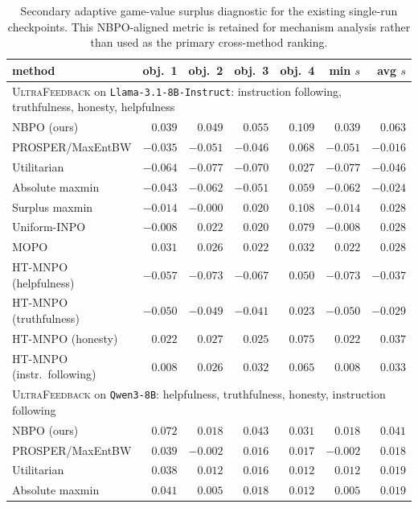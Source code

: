 \documentclass{article}
\theoremstyle{remark}
\theoremstyle{plain}
\newcommand{\NBPO}{\textsc{NBPO}}
\begin{document}
\begin{table}[t]
\centering\scriptsize
\setlength{\tabcolsep}{3.2pt}
\caption{Secondary adaptive game-value surplus diagnostic for the existing single-run checkpoints. This NBPO-aligned metric is retained for mechanism analysis rather than used as the primary cross-method ranking.}
\label{tab:objectivewise-appendix}
\begin{tabular}{lrrrrrr}
\toprule
method & obj.\ 1 & obj.\ 2 & obj.\ 3 & obj.\ 4 & min $s$ & avg $s$\\
\midrule
\multicolumn{7}{l}{\textsc{UltraFeedback} on \texttt{Llama-3.1-8B-Instruct}: instruction following, truthfulness, honesty, helpfulness}\\
\NBPO{} (ours) & $0.039$ & $0.049$ & $0.055$ & $0.109$ & $0.039$ & $0.063$\\
PROSPER/MaxEntBW & $-0.035$ & $-0.051$ & $-0.046$ & $0.068$ & $-0.051$ & $-0.016$\\
Utilitarian & $-0.064$ & $-0.077$ & $-0.070$ & $0.027$ & $-0.077$ & $-0.046$\\
Absolute maxmin & $-0.043$ & $-0.062$ & $-0.051$ & $0.059$ & $-0.062$ & $-0.024$\\
Surplus maxmin & $-0.014$ & $-0.000$ & $0.020$ & $0.108$ & $-0.014$ & $0.028$\\
Uniform-INPO & $-0.008$ & $0.022$ & $0.020$ & $0.079$ & $-0.008$ & $0.028$\\
MOPO & $0.031$ & $0.026$ & $0.022$ & $0.032$ & $0.022$ & $0.028$\\
HT-MNPO (helpfulness) & $-0.057$ & $-0.073$ & $-0.067$ & $0.050$ & $-0.073$ & $-0.037$\\
HT-MNPO (truthfulness) & $-0.050$ & $-0.049$ & $-0.041$ & $0.023$ & $-0.050$ & $-0.029$\\
HT-MNPO (honesty) & $0.022$ & $0.027$ & $0.025$ & $0.075$ & $0.022$ & $0.037$\\
HT-MNPO (instr.\ following) & $0.008$ & $0.026$ & $0.032$ & $0.065$ & $0.008$ & $0.033$\\
\midrule
\multicolumn{7}{l}{\textsc{UltraFeedback} on \texttt{Qwen3-8B}: helpfulness, truthfulness, honesty, instruction following}\\
\NBPO{} (ours) & $0.072$ & $0.018$ & $0.043$ & $0.031$ & $0.018$ & $0.041$\\
PROSPER/MaxEntBW & $0.039$ & $-0.002$ & $0.016$ & $0.017$ & $-0.002$ & $0.018$\\
Utilitarian & $0.038$ & $0.012$ & $0.016$ & $0.012$ & $0.012$ & $0.019$\\
Absolute maxmin & $0.041$ & $0.005$ & $0.018$ & $0.012$ & $0.005$ & $0.019$\\

\end{tabular}
\end{table}
\end{document}
